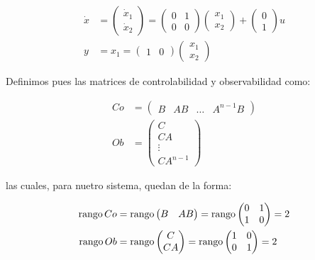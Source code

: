		\begin{align*}
			\dot{x} &=
			\begin{pmatrix}
				\dot{x}_1 \\
				\dot{x}_2
			\end{pmatrix} =
			\begin{pmatrix}
				0 & 1 \\
				0 & 0
			\end{pmatrix}
			\begin{pmatrix}
				x_1 \\
				x_2
			\end{pmatrix} +
			\begin{pmatrix}
				0 \\
				1
			\end{pmatrix} u \\
			y &= x_1 =
			\begin{pmatrix}
				1 & 0
			\end{pmatrix}
			\begin{pmatrix}
				x_1 \\
				x_2
			\end{pmatrix}
		\end{align*}

		Definimos pues las matrices de controlabilidad y observabilidad como:

		\begin{align*}
			Co &=
			\begin{pmatrix}
				B & AB & \dots & A^{n-1}B
			\end{pmatrix} \\
			Ob &=
			\begin{pmatrix}
				C \\
				CA \\
				\vdots \\
				CA^{n-1}
			\end{pmatrix}
		\end{align*}

		las cuales, para nuetro sistema, quedan de la forma:

		\begin{align*}
			\operatorname{rango}{Co} &= \operatorname{rango}{\begin{pmatrix} B & AB \end{pmatrix}} = \operatorname{rango}{\begin{pmatrix} 0 & 1 \\ 1 & 0 \end{pmatrix}} = 2\\
			\operatorname{rango}{Ob} &= \operatorname{rango}{\begin{pmatrix} C \\ CA \end{pmatrix}} = \operatorname{rango}{\begin{pmatrix} 1 & 0 \\ 0 & 1 \end{pmatrix}} = 2
		\end{align*}

